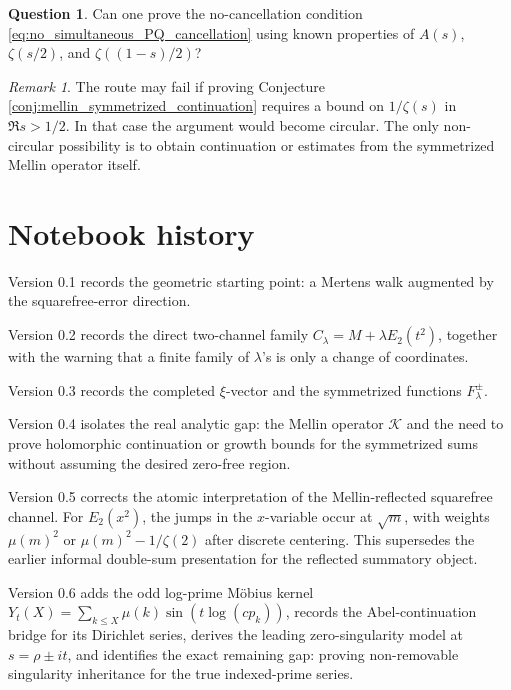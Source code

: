 \documentclass[11pt]{amsart}
\numberwithin{equation}{section}
\theoremstyle{plain}
\theoremstyle{definition}
\newtheorem{question}[theorem]{Question}
\theoremstyle{remark}
\newtheorem{remark}[theorem]{Remark}
\begin{document}
\begin{question}
\label{ques:numerator_no_cancellation}
Can one prove the no-cancellation condition \eqref{eq:no_simultaneous_PQ_cancellation} using known properties of \(A(s)\), \(\zeta(s/2)\), and \(\zeta((1-s)/2)\)?
\end{question}

\begin{remark}
\label{rem:where_route_may_fail}
The route may fail if proving Conjecture \ref{conj:mellin_symmetrized_continuation} requires a bound on \(1/\zeta(s)\) in \(\Re s>1/2\).  In that case the argument would become circular.  The only non-circular possibility is to obtain continuation or estimates from the symmetrized Mellin operator itself.
\end{remark}

\section{Notebook history}
\label{sec:notebook_history}

Version 0.1 records the geometric starting point: a Mertens walk augmented by the squarefree-error direction.

Version 0.2 records the direct two-channel family \(C_\lambda=M+\lambda E_2(t^2)\), together with the warning that a finite family of \(\lambda\)'s is only a change of coordinates.

Version 0.3 records the completed \(\xi\)-vector and the symmetrized functions \(F_\lambda^\pm\).

Version 0.4 isolates the real analytic gap: the Mellin operator \(\mathcal K\) and the need to prove holomorphic continuation or growth bounds for the symmetrized sums without assuming the desired zero-free region.

Version 0.5 corrects the atomic interpretation of the Mellin-reflected squarefree channel.  For \(E_2(x^2)\), the jumps in the \(x\)-variable occur at \(\sqrt m\), with weights \(\mu(m)^2\) or \(\mu(m)^2-1/\zeta(2)\) after discrete centering.  This supersedes the earlier informal double-sum presentation for the reflected summatory object.

Version 0.6 adds the odd log-prime M\"obius kernel
\(Y_t(X)=\sum_{k\le X}\mu(k)\sin(t\log(c p_k))\), records the Abel-continuation bridge for its Dirichlet series, derives the leading zero-singularity model at \(s=\rho\pm it\), and identifies the exact remaining gap: proving non-removable singularity inheritance for the true indexed-prime series.
\end{document}
